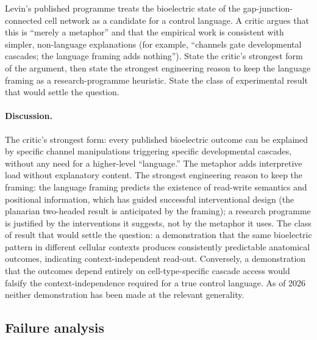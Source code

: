 \begin{exercise}
Levin's published programme treats the bioelectric state of the
gap-junction-connected cell network as a candidate for a control
language. A critic argues that this is ``merely a metaphor'' and that
the empirical work is consistent with simpler, non-language
explanations (for example, ``channels gate developmental cascades; the
language framing adds nothing''). State the critic's strongest form of
the argument, then state the strongest engineering reason to keep the
language framing as a research-programme heuristic. State the class of
experimental result that would settle the question.

\paragraph{Discussion.}
The critic's strongest form: every published bioelectric outcome can
be explained by specific channel manipulations triggering specific
developmental cascades, without any need for a higher-level
``language.'' The metaphor adds interpretive load without explanatory
content. The strongest engineering reason to keep the framing: the
language framing predicts the existence of read-write semantics and
positional information, which has guided successful interventional
design (the planarian two-headed result is anticipated by the
framing); a research programme is justified by the interventions it
suggests, not by the metaphor it uses. The class of result that would
settle the question: a demonstration that the same bioelectric
pattern in different cellular contexts produces consistently
predictable anatomical outcomes, indicating context-independent
read-out. Conversely, a demonstration that the outcomes depend
entirely on cell-type-specific cascade access would falsify the
context-independence required for a true control language. As of
2026 neither demonstration has been made at the relevant generality.
\end{exercise}

\subsection*{Failure analysis}

